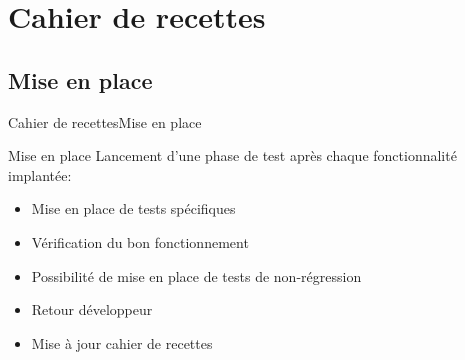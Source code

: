 \section{Cahier de recettes}
     
   \subsection{Mise en place}
      \begin{frame}{Cahier de recettes}{Mise en place}
        \begin{block}{Mise en place}
          Lancement d'une phase de test après chaque fonctionnalité implantée:
          \begin{itemize}
            \item<1-> Mise en place de tests spécifiques
            \item<2-> Vérification du bon fonctionnement
            \item<3-> Possibilité de mise en place de tests de non-régression
            \item<4-> Retour développeur
            \item<5-> Mise à jour cahier de recettes
          \end{itemize}
        \end{block}
      \end{frame}
